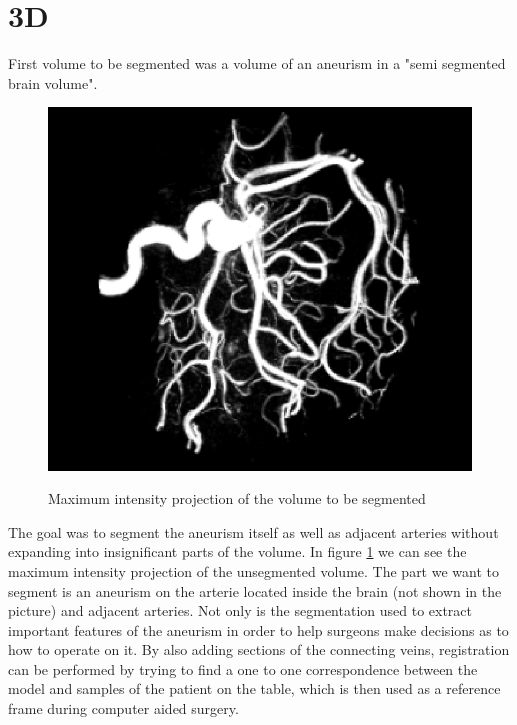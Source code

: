 \section{3D}
First volume to be segmented  was a volume of an aneurism in a "semi segmented brain volume". 
\begin{figure}[h!]
\centering
\includegraphics[width=.9\textwidth]{results/3D/3D-aneurism-unsegmented/aneurism_original_mip}
\label{aneurism_original}
\caption{Maximum intensity projection of the volume to be segmented}
\end{figure}
The goal was to segment the aneurism itself as well as adjacent arteries without expanding into insignificant parts of the volume. In figure \ref{aneurism_original} we can see the maximum intensity projection of the unsegmented volume. The part we want to segment is an aneurism on the arterie located inside the brain (not shown in the picture) and adjacent arteries. Not only is the segmentation used to extract important features of the aneurism in order to help surgeons make decisions as to how to operate on it. By also adding sections of the connecting veins, registration can be performed by trying to find a one to one correspondence between the model and samples of the patient on the table, which is then used as a reference frame during computer aided surgery. 


